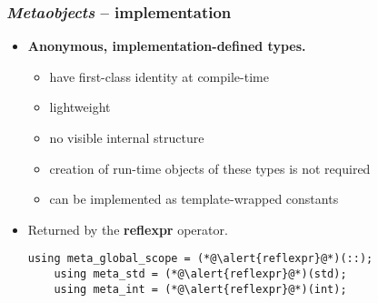 \documentclass[compress,table,xcolor=table]{beamer}
\begin{document}
\begin{frame}[fragile]
\frametitle{{\em Metaobjects} -- implementation}
  \large
  \begin{itemize}
    \item {\Large \textbf{Anonymous, implementation-defined types.}}
    \begin{itemize}
      \small
      \item have first-class identity at compile-time
      \item lightweight
      \item no visible internal structure
      \item creation of run-time objects of these types is not required
      \item can be implemented as template-wrapped constants 
    \end{itemize}
    \item Returned by the \textbf{reflexpr} operator.
    \begin{lstlisting}[basicstyle=\normalsize\ttfamily]
	using meta_global_scope = (*@\alert{reflexpr}@*)(::);
	using meta_std = (*@\alert{reflexpr}@*)(std);
	using meta_int = (*@\alert{reflexpr}@*)(int);
    \end{lstlisting}
  \end{itemize}
\end{frame}
\end{document}
